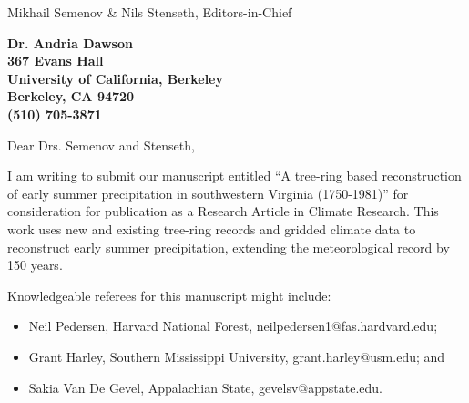 \documentclass[11pt]{letter} %
\begin{document}

\begin{letter}{Mikhail Semenov \& Nils Stenseth, Editors-in-Chief}

\begin{center}
\large\bf Dr. Andria Dawson \\ %
367 Evans Hall \\ University of California, Berkeley\\ Berkeley, CA 94720 \\ (510) 705-3871 %
\end{center} 
\vfill

\signature{Andria Dawson} %


\opening{Dear Drs. Semenov and Stenseth,} 
 
I am writing to submit our manuscript entitled ``A tree-ring based
reconstruction of early summer precipitation in southwestern Virginia
(1750-1981)'' for consideration for publication as a Research Article in Climate
Research. This work uses new and existing tree-ring records and
gridded climate data to reconstruct early summer
precipitation, extending the meteorological record by 150 years.

Knowledgeable referees for this manuscript might include:
\begin{itemize}
\item Neil Pedersen, Harvard National Forest, neilpedersen1@fas.hardvard.edu;
\item Grant Harley, Southern Mississippi University, grant.harley@usm.edu; and
\item Sakia Van De Gevel, Appalachian State, gevelsv@appstate.edu.
\end{itemize}



\end{letter}
\end{document}
